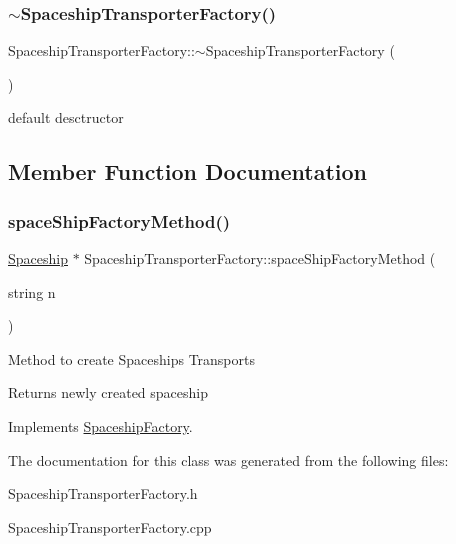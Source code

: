 \subsubsection{\texorpdfstring{$\sim$\+Spaceship\+Transporter\+Factory()}{~SpaceshipTransporterFactory()}}
{\footnotesize\ttfamily Spaceship\+Transporter\+Factory\+::$\sim$\+Spaceship\+Transporter\+Factory (\begin{DoxyParamCaption}{ }\end{DoxyParamCaption})}

default desctructor 

\subsection{Member Function Documentation}
\mbox{\label{classSpaceshipTransporterFactory_a8bcd955724ffca8ffdc07d2ef1561d24}} 
\subsubsection{\texorpdfstring{space\+Ship\+Factory\+Method()}{spaceShipFactoryMethod()}}
{\footnotesize\ttfamily \hyperlink{classSpaceship}{Spaceship} $\ast$ Spaceship\+Transporter\+Factory\+::space\+Ship\+Factory\+Method (\begin{DoxyParamCaption}\item[{string}]{n }\end{DoxyParamCaption})\hspace{0.3cm}{\ttfamily [virtual]}}

Method to create Spaceships Transports \begin{DoxyReturn}{Returns}
newly created spaceship 
\end{DoxyReturn}


Implements \hyperlink{classSpaceshipFactory_a70b50dd616cb16f50088eff9ca07cda9}{Spaceship\+Factory}.



The documentation for this class was generated from the following files\+:\begin{DoxyCompactItemize}
\item 
Spaceship\+Transporter\+Factory.\+h\item 
Spaceship\+Transporter\+Factory.\+cpp\end{DoxyCompactItemize}
